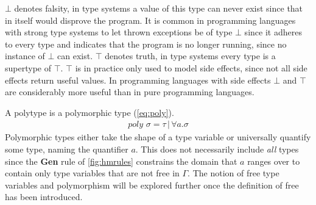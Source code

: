$\bot$ denotes falsity, in type systems a value of this type can never exist since that in itself would disprove the program.
It is common in programming languages with strong type systems to let thrown exceptions be of type $\bot$ since it adheres to every type and indicates that the program is no longer running, since no instance of $\bot$ can exist.
$\top$ denotes truth, in type systems every type is a supertype of $\top$.
$\top$ is in practice only used to model side effects, since not all side effects return useful values.
In programming languages with side effects $\bot$ and $\top$ are considerably more useful than in pure programming languages.

A polytype is a polymorphic type (\autoref{eq:poly}).
\begin{align}
	poly \,\, \sigma = \tau \,|\, \forall a . \sigma
	\label{eq:poly}
\end{align}
Polymorphic types either take the shape of a type variable or universally quantify some type, naming the quantifier $a$.
This does not necessarily include \textit{all} types since the \textbf{Gen} rule of \autoref{fig:hmrules} constrains the domain that $a$ ranges over to contain only type variables that are not free in $\Gamma$.
The notion of free type variables and polymorphism will be explored further once the definition of free has been introduced.

